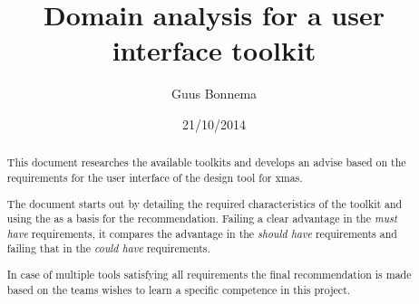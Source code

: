 \documentclass[a4paper,11pt,final]{article}
\author{Guus Bonnema}
\date{21/10/2014}
\title{Domain analysis for a user interface toolkit}
\begin{document}

\newcommand{\xmas}{x\textsc{mas}}%
\newcommand{\ok}{$\checkmark$}

\newcommand{\mybox}[1]{\begin{boxedminipage}[t]{\textwidth}#1\end{boxedminipage}}


\newcommand\secformat[1]{%
    {\fontsize{60}{60}\selectfont\thesection}%
    \ifthenelse{\equal{\thesection}{}}{}{\quad\rule[-8pt]{2pt}{40pt}\quad}
    \parbox[b]{.7\textwidth}{\filright\bfseries #1}}%
\titleformat{\section}[block]
    {\filright\normalfont\sffamily}{}{0pt}{\secformat}
[1pc]

\maketitle

\begin{abstract}
    This document researches the available toolkits and develops an advise
    based on the requirements for the user interface of the design tool for xmas.

    The document starts out by detailing the required characteristics of the toolkit
    and using the as a basis for the recommendation. Failing a clear advantage in the
    \emph{must have} requirements, it compares the advantage in the \emph{should have}
    requirements and failing that in the \emph{could have} requirements.

    In case of multiple tools satisfying all requirements the final recommendation is made
    based on the teams wishes to learn a specific competence in this project.
\end{abstract}

\end{document}
